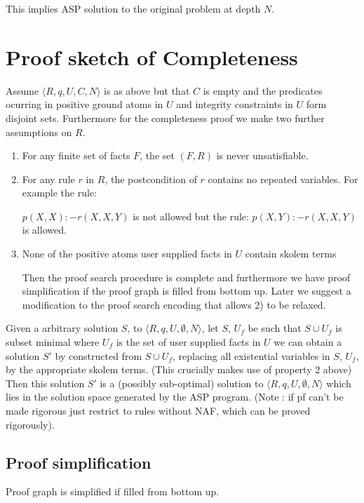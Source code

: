 This implies ASP solution to the original problem at depth $N$.


\section{Proof sketch of Completeness}

Assume $\langle R,q,U,C,N\rangle$ is as above but that $C$ is empty and the predicates ocurring in positive ground atoms in $U$ and integrity constraints in $U$ form disjoint sets. Furthermore for the completeness proof we make two further assumptions on $R$.

\begin{enumerate}
\item For any finite set of facts $F$, the set $(F,R)$ is never unsatisfiable.

\item For any rule $r$ in $R$, the postcondition of $r$ contains no repeated
  variables. For example the rule:
  
$p(X,X):-r(X,X,Y)$ is not allowed but the rule: $p(X,Y):-r(X,X,Y)$ is allowed.

\item None of the positive atoms user supplied facts in $U$ contain skolem terms

Then the proof search procedure is complete and furthermore we have proof simplification if the proof graph is filled from bottom up. Later we suggest a modification to the proof search encoding that allows 2) to be relaxed.
\end{enumerate}

Given a arbitrary solution $S$, to $\langle R,q,U,\emptyset,N\rangle$, let
$S$, $U_{f}$ be such that $S\cup U_{f}$ is subset minimal where $U_{f}$ is the
set of user supplied facts in $U$ we can obtain a solution $S'$ by constructed
from $S\cup U_{f}$, replacing all existential variables in $S$, $U_{f}$, by
the appropriate skolem terms. (This crucially makes use of property 2 above)
Then this solution $S'$ is a (possibly sub-optimal) solution to $\langle
R,q,U,\emptyset,N\rangle$ which lies in the solution space generated by the
ASP program.  (Note : if pf can't be made rigorous just restrict to rules
without NAF, which can be proved rigorously).

\subsection{Proof simplification}
Proof graph is simplified if filled from bottom up.


